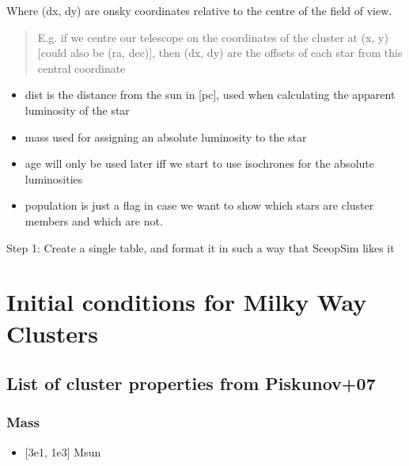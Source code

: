 \documentclass[letterpaper,10pt,english]{sphinxmanual}
\begin{document}
\sphinxAtStartPar
Where
\sphinxhyphen{} (dx, dy) are on\sphinxhyphen{}sky coordinates relative to the centre of the field of view.
\begin{quote}

\sphinxAtStartPar
E.g. if we centre our telescope on the coordinates of the cluster at (x, y) {[}could also be (ra, dec){]},
then (dx, dy) are the offsets of each star from this central coordinate
\end{quote}
\begin{itemize}
\item {} 
\sphinxAtStartPar
dist is the distance from the sun in {[}pc{]}, used when calculating the apparent luminosity of the star

\item {} 
\sphinxAtStartPar
mass used for assigning an absolute luminosity to the star

\item {} 
\sphinxAtStartPar
age will only be used later iff we start to use isochrones for the absolute luminosities

\item {} 
\sphinxAtStartPar
population is just a flag in case we want to show which stars are cluster members and which are not.

\end{itemize}

\sphinxAtStartPar
Step 1: Create a single table, and format it in such a way that SceopSim likes it


\chapter{Initial conditions for Milky Way Clusters}
\label{\detokenize{Project_Overview/MilkyWayClusters:initial-conditions-for-milky-way-clusters}}\label{\detokenize{Project_Overview/MilkyWayClusters::doc}}

\section{List of cluster properties from Piskunov+07}
\label{\detokenize{Project_Overview/MilkyWayClusters:list-of-cluster-properties-from-piskunov-07}}

\subsection{Mass}
\label{\detokenize{Project_Overview/MilkyWayClusters:mass}}\begin{itemize}
\item {} 
\sphinxAtStartPar
{[}3e1, 1e3{]} Msun

\end{itemize}
\end{document}
